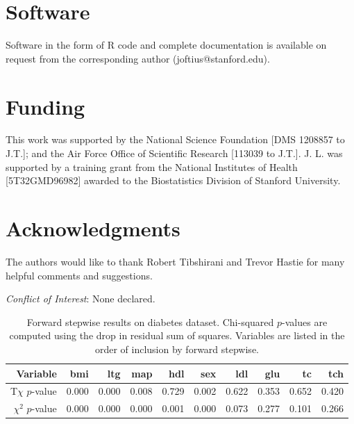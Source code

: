 \documentclass[oupdraft]{bio}
\begin{document}
\section{Software}
\label{sec5}

Software in the form of R code and complete documentation is available on request from the corresponding author (joftius@stanford.edu).




\section*{Funding}

This work was supported by the National Science Foundation [DMS 1208857 to J.T.]; and the Air Force Office of Scientific Research [113039 to J.T.]. J. L. was supported by a training grant from the National Institutes of Health [5T32GMD96982] awarded to the Biostatistics Division of Stanford University.

\section*{Acknowledgments}
The authors would like to thank Robert Tibshirani and Trevor Hastie for many helpful comments and suggestions.

{\it Conflict of Interest}: None declared.





\begin{table}[ht]
\centering
\begin{tabular}{r|rrrrrrrrr}
  \hline
Variable & bmi & ltg & map & hdl & sex & ldl & glu & tc & tch \\ 
  \hline
T$\chi$ $p$-value & 0.000 & 0.000 & 0.008 & 0.729 & 0.002 & 0.622 & 0.353 & 0.652 & 0.420 \\ 
$\chi^2$ $p$-value & 0.000 & 0.000 & 0.000 & 0.001 & 0.000 & 0.073 & 0.277 & 0.101 & 0.266 \\ 
   \hline
\end{tabular}
\caption{Forward stepwise results on diabetes dataset. Chi-squared $p$-values are computed using the drop in residual sum of squares. Variables are listed in the order of inclusion by forward stepwise.} 
\label{tab:diabetes}
\end{table}
\end{document}

